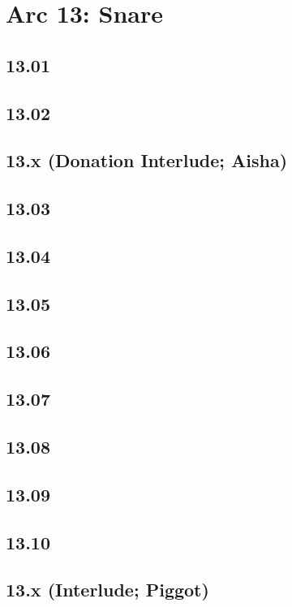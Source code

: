 \part*{Arc 13: Snare}
 \chapter*{13.01}
 \chapter*{13.02}
 \chapter*{13.x (Donation Interlude; Aisha)}
 \chapter*{13.03}
 \chapter*{13.04}
 \chapter*{13.05}
 \chapter*{13.06}
 \chapter*{13.07}
 \chapter*{13.08}
 \chapter*{13.09}
 \chapter*{13.10}
 \chapter*{13.x (Interlude; Piggot)}













